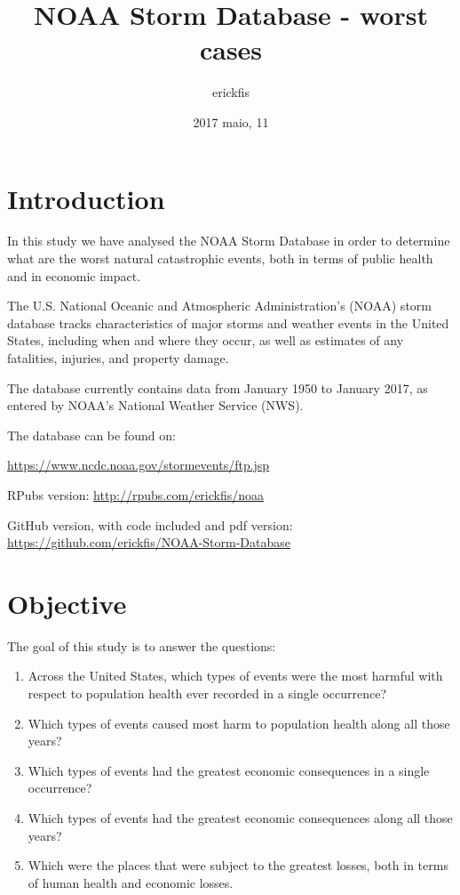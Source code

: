 \documentclass[]{article}
\title{NOAA Storm Database - worst cases}
\author{erickfis}
\date{2017 maio, 11}
\begin{document}
\maketitle

{
\setcounter{tocdepth}{3}
\tableofcontents
}
\newpage

\section{Introduction}\label{introduction}

In this study we have analysed the NOAA Storm Database in order to
determine what are the worst natural catastrophic events, both in terms
of public health and in economic impact.

The U.S. National Oceanic and Atmospheric Administration's (NOAA) storm
database tracks characteristics of major storms and weather events in
the United States, including when and where they occur, as well as
estimates of any fatalities, injuries, and property damage.

The database currently contains data from January 1950 to January 2017,
as entered by NOAA's National Weather Service (NWS).

The database can be found on:

\url{https://www.ncdc.noaa.gov/stormevents/ftp.jsp}

RPubs version: \url{http://rpubs.com/erickfis/noaa}

GitHub version, with code included and pdf version:
\url{https://github.com/erickfis/NOAA-Storm-Database}

\section{Objective}\label{objective}

The goal of this study is to answer the questions:

\begin{enumerate}
\def\labelenumi{\arabic{enumi}.}
\item
  Across the United States, which types of events were the most harmful
  with respect to population health ever recorded in a single
  occurrence?
\item
  Which types of events caused most harm to population health along all
  those years?
\item
  Which types of events had the greatest economic consequences in a
  single occurrence?
\item
  Which types of events had the greatest economic consequences along all
  those years?
\item
  Which were the places that were subject to the greatest losses, both
  in terms of human health and economic losses.
\end{enumerate}
\end{document}
